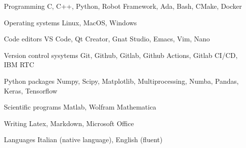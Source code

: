 

\begin{cvskills}

    \cvskill
    {Programming} %
    {C, C++, Python, Robot Framework, Ada, Bash, CMake, Docker} %

    \cvskill
    {Operating systems} %
    {Linux, MacOS, Windows} %

    \cvskill
    {Code editors} %
    {VS Code, Qt Creator, Gnat Studio, Emacs, Vim, Nano} %

    \cvskill
    {Version control sysytems} %
    {Git, Github, Gitlab, Github Actions, Gitlab CI/CD, IBM RTC} %

    
    \cvskill
    {Python packages} %
    {Numpy, Scipy, Matplotlib, Multiprocessing, Numba, Pandas, Keras, Tensorflow}
    
    \cvskill
    {Scientific programs} %
    {Matlab, Wolfram Mathematica} %

    \cvskill
    {Writing} %
    {Latex, Markdown, Microsoft Office} %

    \cvskill
        {Languages} %
        {Italian (native language), English (fluent)} %

\end{cvskills}